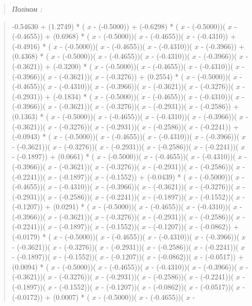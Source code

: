 \documentclass[a4paper, 12pt]{article}
\begin{document}
\begin{quote}
\textit{Поліном :} 
\end{quote}

\begin{quote}
	-0.54630 + (1.2749) * ( \( x \)  - (-0.5000)) + (-0.6298) * ( \( x \)  - (-0.5000))( \( x \)  - (-0.4655)) + (0.6968) * ( \( x \)  - (-0.5000))( \( x \)  - (-0.4655))( \( x \)  - (-0.4310)) + (-0.4916) * ( \( x \)  - (-0.5000))( \( x \)  - (-0.4655))( \( x \)  - (-0.4310))( \( x \)  - (-0.3966)) + (0.4368) * ( \( x \)  - (-0.5000))( \( x \)  - (-0.4655))( \( x \)  - (-0.4310))( \( x \)  - (-0.3966))( \( x \)  - (-0.3621)) + (-0.3200) * ( \( x \)  - (-0.5000))( \( x \)  - (-0.4655))( \( x \)  - (-0.4310))( \( x \)  - (-0.3966))( \( x \)  - (-0.3621))( \( x \)  - (-0.3276)) + (0.2554) * ( \( x \)  - (-0.5000))( \( x \)  - (-0.4655))( \( x \)  - (-0.4310))( \( x \)  - (-0.3966))( \( x \)  - (-0.3621))( \( x \)  - (-0.3276))( \( x \)  - (-0.2931)) + (-0.1834) * ( \( x \)  - (-0.5000))( \( x \)  - (-0.4655))( \( x \)  - (-0.4310))( \( x \)  - (-0.3966))( \( x \)  - (-0.3621))( \( x \)  - (-0.3276))( \( x \)  - (-0.2931))( \( x \)  - (-0.2586)) + (0.1363) * ( \( x \)  - (-0.5000))( \( x \)  - (-0.4655))( \( x \)  - (-0.4310))( \( x \)  - (-0.3966))( \( x \)  - (-0.3621))( \( x \)  - (-0.3276))( \( x \)  - (-0.2931))( \( x \)  - (-0.2586))( \( x \)  - (-0.2241)) + (-0.0943) * ( \( x \)  - (-0.5000))( \( x \)  - (-0.4655))( \( x \)  - (-0.4310))( \( x \)  - (-0.3966))( \( x \)  - (-0.3621))( \( x \)  - (-0.3276))( \( x \)  - (-0.2931))( \( x \)  - (-0.2586))( \( x \)  - (-0.2241))( \( x \)  - (-0.1897)) + (0.0661) * ( \( x \)  - (-0.5000))( \( x \)  - (-0.4655))( \( x \)  - (-0.4310))( \( x \)  - (-0.3966))( \( x \)  - (-0.3621))( \( x \)  - (-0.3276))( \( x \)  - (-0.2931))( \( x \)  - (-0.2586))( \( x \)  - (-0.2241))( \( x \)  - (-0.1897))( \( x \)  - (-0.1552)) + (-0.0439) * ( \( x \)  - (-0.5000))( \( x \)  - (-0.4655))( \( x \)  - (-0.4310))( \( x \)  - (-0.3966))( \( x \)  - (-0.3621))( \( x \)  - (-0.3276))( \( x \)  - (-0.2931))( \( x \)  - (-0.2586))( \( x \)  - (-0.2241))( \( x \)  - (-0.1897))( \( x \)  - (-0.1552))( \( x \)  - (-0.1207)) + (0.0291) * ( \( x \)  - (-0.5000))( \( x \)  - (-0.4655))( \( x \)  - (-0.4310))( \( x \)  - (-0.3966))( \( x \)  - (-0.3621))( \( x \)  - (-0.3276))( \( x \)  - (-0.2931))( \( x \)  - (-0.2586))( \( x \)  - (-0.2241))( \( x \)  - (-0.1897))( \( x \)  - (-0.1552))( \( x \)  - (-0.1207))( \( x \)  - (-0.0862)) + (-0.0179) * ( \( x \)  - (-0.5000))( \( x \)  - (-0.4655))( \( x \)  - (-0.4310))( \( x \)  - (-0.3966))( \( x \)  - (-0.3621))( \( x \)  - (-0.3276))( \( x \)  - (-0.2931))( \( x \)  - (-0.2586))( \( x \)  - (-0.2241))( \( x \)  - (-0.1897))( \( x \)  - (-0.1552))( \( x \)  - (-0.1207))( \( x \)  - (-0.0862))( \( x \)  - (-0.0517)) + (0.0094) * ( \( x \)  - (-0.5000))( \( x \)  - (-0.4655))( \( x \)  - (-0.4310))( \( x \)  - (-0.3966))( \( x \)  - (-0.3621))( \( x \)  - (-0.3276))( \( x \)  - (-0.2931))( \( x \)  - (-0.2586))( \( x \)  - (-0.2241))( \( x \)  - (-0.1897))( \( x \)  - (-0.1552))( \( x \)  - (-0.1207))( \( x \)  - (-0.0862))( \( x \)  - (-0.0517))( \( x \)  - (-0.0172)) + (0.0007) * ( \( x \)  - (-0.5000))( \( x \)  - (-0.4655))( \( x \)  - 
\end{quote}
\end{document}
